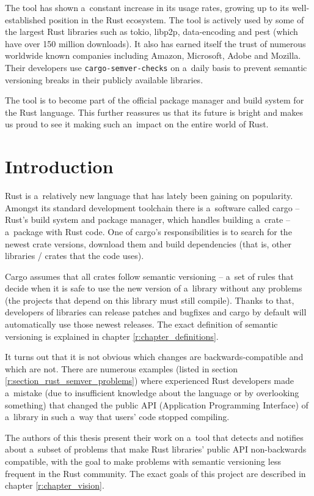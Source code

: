 \documentclass[licencjacka,en]{pracamgr}
\begin{document}
The tool has shown a~constant increase in its usage rates, growing up to its
well-established position in the Rust ecosystem. The tool is actively used by some of
the largest Rust libraries such as tokio, libp2p, data-encoding and pest (which have
over 150 million downloads). It also has earned itself the trust of numerous worldwide
known companies including Amazon, Microsoft, Adobe and Mozilla. Their developers
use \texttt{cargo-semver-checks} on a~daily basis to prevent semantic versioning breaks in their
publicly available libraries.

The tool is to become part of the official package manager and build system for the Rust language.
This further reassures us that its future is bright and makes us proud to see it making
such an~impact on the entire world of Rust.


\chapter*{Introduction}

Rust is a~relatively new language that has lately been gaining on popularity. Amongst its standard
development toolchain there is a~software called cargo -- Rust's build system and package manager,
which handles building a~crate -- a~package with Rust code. One of cargo's responsibilities is to
search for the newest crate versions, download them and build dependencies (that is, other
libraries / crates that the code uses).

Cargo assumes that all crates follow semantic versioning -- a~set of rules that decide when it is
safe to use the new version of a~library without any problems (the projects that depend on this
library must still compile). Thanks to that, developers of libraries can release patches and
bugfixes and cargo by default will automatically use those newest releases. The exact definition of
semantic versioning is explained in chapter \ref{r:chapter_definitions}.

It turns out that it is not obvious which changes are backwards-compatible and which are not.
There are numerous examples (listed in section \ref{r:section_rust_semver_problems})
where experienced Rust developers made a~mistake (due to insufficient knowledge about the language
or by overlooking something) that changed the public API (Application Programming Interface)
of a~library in such a~way that users' code stopped compiling.

The authors of this thesis present their work on a~tool that detects and notifies about a~subset of
problems that make Rust libraries' public API non-backwards compatible, with the goal to make
problems with semantic versioning less frequent in the Rust community. The exact goals of this
project are described in chapter \ref{r:chapter_vision}.
\end{document}
